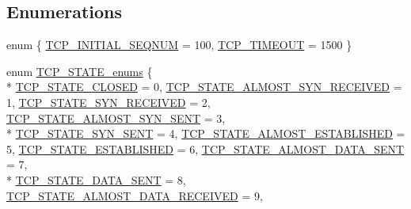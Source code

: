 \subsection*{Enumerations}
\begin{DoxyCompactItemize}
\item 
enum \{ \hyperlink{group___open_tcp_gga8feb5a39a55448c86e0dfc20f53a6c1da2f1c431b36e504d5b111a14dfb520c1d}{T\+C\+P\+\_\+\+I\+N\+I\+T\+I\+A\+L\+\_\+\+S\+E\+Q\+N\+UM} = 100, 
\hyperlink{group___open_tcp_gga8feb5a39a55448c86e0dfc20f53a6c1da0558eaf1678efcce0e1eea1dc6a0098a}{T\+C\+P\+\_\+\+T\+I\+M\+E\+O\+UT} = 1500
 \}
\item 
enum \hyperlink{group___open_tcp_ga9bbc2fffc1e95dd53c889fc6536e5d85}{T\+C\+P\+\_\+\+S\+T\+A\+T\+E\+\_\+enums} \{ \\*
\hyperlink{group___open_tcp_gga9bbc2fffc1e95dd53c889fc6536e5d85a1af39131036c81d79f09174d2fb6f788}{T\+C\+P\+\_\+\+S\+T\+A\+T\+E\+\_\+\+C\+L\+O\+S\+ED} = 0, 
\hyperlink{group___open_tcp_gga9bbc2fffc1e95dd53c889fc6536e5d85a2313774fe493b5accb2de21ca81ab8aa}{T\+C\+P\+\_\+\+S\+T\+A\+T\+E\+\_\+\+A\+L\+M\+O\+S\+T\+\_\+\+S\+Y\+N\+\_\+\+R\+E\+C\+E\+I\+V\+ED} = 1, 
\hyperlink{group___open_tcp_gga9bbc2fffc1e95dd53c889fc6536e5d85adfce7e58cb083022157243f993d4ddc3}{T\+C\+P\+\_\+\+S\+T\+A\+T\+E\+\_\+\+S\+Y\+N\+\_\+\+R\+E\+C\+E\+I\+V\+ED} = 2, 
\hyperlink{group___open_tcp_gga9bbc2fffc1e95dd53c889fc6536e5d85ad94e102f8267ead2ee6f2a13ad6b1f37}{T\+C\+P\+\_\+\+S\+T\+A\+T\+E\+\_\+\+A\+L\+M\+O\+S\+T\+\_\+\+S\+Y\+N\+\_\+\+S\+E\+NT} = 3, 
\\*
\hyperlink{group___open_tcp_gga9bbc2fffc1e95dd53c889fc6536e5d85a63834296a6449f272b397d54a5536bfc}{T\+C\+P\+\_\+\+S\+T\+A\+T\+E\+\_\+\+S\+Y\+N\+\_\+\+S\+E\+NT} = 4, 
\hyperlink{group___open_tcp_gga9bbc2fffc1e95dd53c889fc6536e5d85ac8455e6b237162e5481359f6a7b08817}{T\+C\+P\+\_\+\+S\+T\+A\+T\+E\+\_\+\+A\+L\+M\+O\+S\+T\+\_\+\+E\+S\+T\+A\+B\+L\+I\+S\+H\+ED} = 5, 
\hyperlink{group___open_tcp_gga9bbc2fffc1e95dd53c889fc6536e5d85aacb7ccce8d3fcdbc6635983251b22189}{T\+C\+P\+\_\+\+S\+T\+A\+T\+E\+\_\+\+E\+S\+T\+A\+B\+L\+I\+S\+H\+ED} = 6, 
\hyperlink{group___open_tcp_gga9bbc2fffc1e95dd53c889fc6536e5d85ac51a7ef1f30c87ed8de9ab65433a1e72}{T\+C\+P\+\_\+\+S\+T\+A\+T\+E\+\_\+\+A\+L\+M\+O\+S\+T\+\_\+\+D\+A\+T\+A\+\_\+\+S\+E\+NT} = 7, 
\\*
\hyperlink{group___open_tcp_gga9bbc2fffc1e95dd53c889fc6536e5d85a9cf70204ee93a4754c3581ee1b1b1fe2}{T\+C\+P\+\_\+\+S\+T\+A\+T\+E\+\_\+\+D\+A\+T\+A\+\_\+\+S\+E\+NT} = 8, 
\hyperlink{group___open_tcp_gga9bbc2fffc1e95dd53c889fc6536e5d85ae02b15c0ddc732781a611dc32209feaf}{T\+C\+P\+\_\+\+S\+T\+A\+T\+E\+\_\+\+A\+L\+M\+O\+S\+T\+\_\+\+D\+A\+T\+A\+\_\+\+R\+E\+C\+E\+I\+V\+ED} = 9, 

\end{DoxyCompactItemize}
